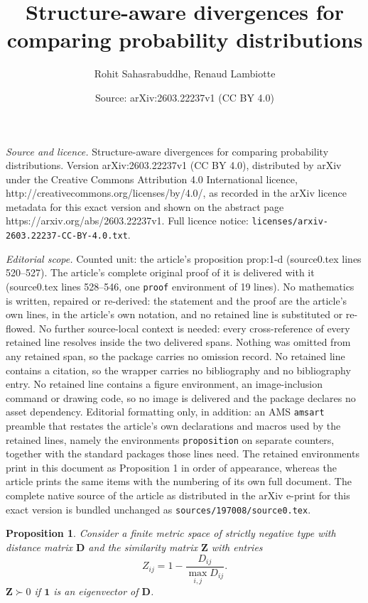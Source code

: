 \documentclass[10pt,a4paper]{amsart}
\title{Structure-aware divergences for comparing probability distributions}
\author{Rohit Sahasrabuddhe, Renaud Lambiotte}
\date{Source: arXiv:2603.22237v1 (CC BY 4.0)}
\newtheorem{proposition}{Proposition}
\renewcommand{\vec}[1]{\mathbf{#1}}
\begin{document}
\maketitle

\noindent\emph{Source and licence.} Structure-aware divergences for comparing probability distributions. Version arXiv:2603.22237v1 (CC BY 4.0), distributed by arXiv under the Creative Commons Attribution 4.0 International licence, http://creativecommons.org/licenses/by/4.0/, as recorded in the arXiv licence metadata for this exact version and shown on the abstract page https://arxiv.org/abs/2603.22237v1. Full licence notice: \texttt{licenses/arxiv-2603.22237-CC-BY-4.0.txt}.\par\smallskip

\noindent\textit{Editorial scope.} Counted unit: the article's proposition prop:1-d (source0.tex lines 520--527). The article's complete original proof of it is delivered with it (source0.tex lines 528--546, one \texttt{proof} environment of 19 lines). No mathematics is written, repaired or re-derived: the statement and the proof are the article's own lines, in the article's own notation, and no retained line is substituted or re-flowed.  No further source-local context is needed: every cross-reference of every retained line resolves inside the two delivered spans.  Nothing was omitted from any retained span, so the package carries no omission record.  No retained line contains a citation, so the wrapper carries no bibliography and no bibliography entry.  No retained line contains a figure environment, an image-inclusion command or drawing code, so no image is delivered and the package declares no asset dependency.  Editorial formatting only, in addition: an AMS \texttt{amsart} preamble that restates the article's own declarations and macros used by the retained lines, namely the environments \texttt{proposition} on separate counters, together with the standard packages those lines need.  The retained environments print in this document as Proposition 1 in order of appearance, whereas the article prints the same items with the numbering of its own full document.  The complete native source of the article as distributed in the arXiv e-print for this exact version is bundled unchanged as \texttt{sources/197008/source0.tex}.
\begin{proposition}
    Consider a finite metric space of strictly negative type with distance matrix $\vec{D}$ and the similarity matrix $\vec{Z}$ with entries 
    \begin{equation*}
        Z_{ij}=1-\frac{D_{ij}}{\max_{i,j}D_{ij}}.
    \end{equation*}
    $\vec{Z} \succ 0$ if $\vec{1}$ is an eigenvector of $\vec{D}$.
\label{prop:1-d}
\end{proposition}
\end{document}
